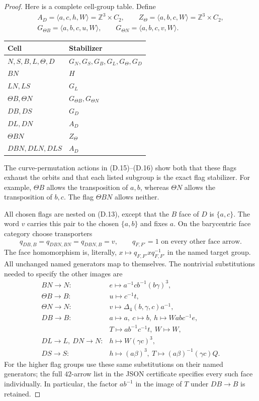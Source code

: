 \begin{proof}
Here is a complete cell-group table.  Define
\[
\begin{gathered}
 A_D=\langle a,c,h,W\rangle=\mathbb Z^3\times C_2,
 \qquad Z_\Theta=\langle a,b,c,W\rangle=\mathbb Z^3\times C_2,\\
 G_{\Theta B}=\langle a,b,c,u,W\rangle,
 \qquad G_{\Theta N}=\langle a,b,c,v,W\rangle.
\end{gathered}
\]
\begin{center}
\begin{tabular}{ll}
\toprule
Cell & Stabilizer\\
\midrule
$N,S,B,L,\Theta,D$ & $G_N,G_S,G_B,G_L,G_\Theta,G_D$\\
$BN$ & $H$\\
$LN,LS$ & $G_L$\\
$\Theta B,\Theta N$ & $G_{\Theta B},G_{\Theta N}$\\
$DB,DS$ & $G_D$\\
$DL,DN$ & $A_D$\\
$\Theta BN$ & $Z_\Theta$\\
$DBN,DLN,DLS$ & $A_D$\\
\bottomrule
\end{tabular}
\end{center}
The curve-permutation actions in (D.15)--(D.16) show both
that these flags exhaust the orbits and that each listed
subgroup is the exact flag stabilizer.  For example,
$\Theta B$ allows the transposition of $a,b$, whereas
$\Theta N$ allows the transposition of $b,c$.  The flag
$\Theta BN$ allows neither.

All chosen flags are nested on (D.13), except that the
$B$ face of $D$ is $\{a,c\}$.  The word $v$ carries this
pair to the chosen $\{a,b\}$ and fixes $a$.  On the
barycentric face category choose transporters
\[
 q_{DB,B}=q_{DBN,BN}=q_{DBN,B}=v,
 \qquad q_{F,F'}=1\text{ on every other face arrow}.          \tag{D.17}
\]
The face homomorphism is, literally,
$x\mapsto q_{F,F'}xq_{F,F'}^{-1}$ in the named target group.
All unchanged named generators map to themselves.  The
nontrivial substitutions needed to specify the other
images are
\[
\begin{array}{ll}
 BN\to N:& e\mapsto a^{-1}cb^{-1}(b\gamma)^3,\\
 \Theta B\to B:&u\mapsto c^{-1}t,\\
 \Theta N\to N:&v\mapsto\Delta_4(b,\gamma,c)a^{-1},\\
 DB\to B:&a\mapsto a,\ c\mapsto b,\
 h\mapsto Wabc^{-1}e,\\
 &T\mapsto ab^{-1}c^{-1}t,\ W\mapsto W,\\
 DL\to L,\ DN\to N:&h\mapsto W(\gamma c)^3,\\
 DS\to S:&h\mapsto(a\beta)^3,\
 T\mapsto(a\beta)^{-1}(\gamma c)Q.
\end{array}                                                       \tag{D.18}
\]
For the higher flag groups use these same substitutions
on their named generators; the full $42$-arrow list in
the JSON certificate specifies every such face individually.
In particular, the factor $ab^{-1}$ in the image of $T$
under $DB\to B$ is retained.


\end{proof}
